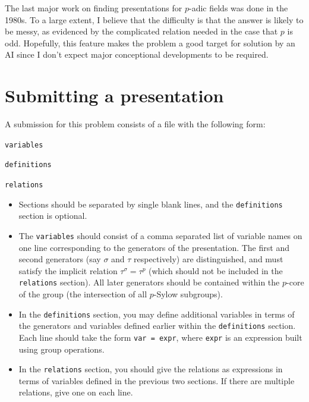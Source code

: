 \documentclass{amsart}
\begin{document}
The last major work on finding presentations for $p$-adic fields was done in the 1980s.  To a large extent, I believe that the difficulty is that the answer is likely to be messy, as evidenced by the complicated relation needed in the case that $p$ is odd.  Hopefully, this feature makes the problem a good target for solution by an AI since I don't expect major conceptional developments to be required.

\section{Submitting a presentation}

A submission for this problem consists of a file with the following form:

\vspace{0.1in}
\texttt{variables}
\vspace{0.1in}

\texttt{definitions}
\vspace{0.1in}

\texttt{relations}
\vspace{0.1in}

\begin{itemize}
\item Sections should be separated by single blank lines, and the \texttt{definitions} section is optional. 
\item The \texttt{variables} should consist of a comma separated list of variable names on one line corresponding to the generators of the presentation.  The first and second generators (say $\sigma$ and $\tau$ respectively) are distinguished, and must satisfy the implicit relation $\tau^\sigma = \tau^p$ (which should not be included in the \texttt{relations} section).  All later generators should be contained within the $p$-core of the group (the intersection of all $p$-Sylow subgroups).
\item In the \texttt{definitions} section, you may define additional variables in terms of the generators and variables defined earlier within the \texttt{definitions} section.  Each line should take the form \texttt{var = expr}, where \texttt{expr} is an expression built using group operations.
\item In the \texttt{relations} section, you should give the relations as expressions in terms of variables defined in the previous two sections.  If there are multiple relations, give one on each line.
\end{itemize}
\end{document}
